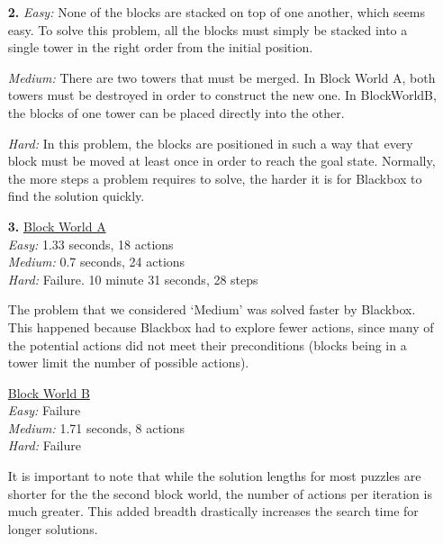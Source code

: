 \documentclass{article}
\begin{document}
\begin{enumerate}
\item[\textbf{2.}]
\emph{Easy:}
None of the blocks are stacked on top of one another, which seems easy.
To solve this problem, all the blocks must simply be stacked into a
single tower in the right order from the initial position.

\emph{Medium:}
There are two towers that must be merged.  In Block World A,
both towers must be destroyed in order to construct the new
one.  In BlockWorldB, the blocks of one tower can be placed
directly into the other.

\emph{Hard:}
In this problem, the blocks are positioned in such a way that every 
block must be moved at least once in order to reach the goal state.
Normally, the more steps a problem requires to solve, the harder it is
for Blackbox to find the solution quickly.

\item[\textbf{3.}]
\underline{Block World A}\\
\emph{Easy:} 1.33 seconds, 18 actions\\
\emph{Medium:} 0.7 seconds, 24 actions\\
\emph{Hard:} Failure. 10 minute 31 seconds, 28 steps

The problem that we considered ‘Medium’ was solved faster by Blackbox.
This happened because Blackbox had to explore fewer actions, since many
of the potential actions did not meet their preconditions (blocks being
in a tower limit the number of possible actions).

\underline{Block World B}\\
\emph{Easy:} Failure\\
\emph{Medium:} 1.71 seconds, 8 actions\\
\emph{Hard:} Failure

It is important to note that while the solution lengths for most puzzles
are shorter for the the second block world, the number of actions per
iteration is much greater.  This added breadth drastically increases the
search time for longer solutions.
\end{enumerate}
\end{document}
